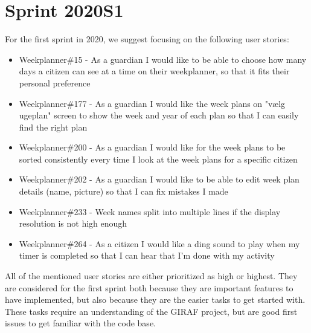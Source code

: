 \section{Sprint 2020S1}
For the first sprint in 2020, we suggest focusing on the following user stories:

\begin{itemize}
    \item Weekplanner\#15 - As a guardian I would like to be able to choose how many days a citizen can see at a time on their weekplanner, so that it fits their personal preference 
    \item Weekplanner\#177 - As a guardian I would like the week plans on "vælg ugeplan" screen to show the week and year of each plan so that I can easily find the right plan 
    \item Weekplanner\#200 - As a guardian I would like for the week plans to be sorted consistently every time I look at the week plans for a specific citizen
    \item Weekplanner\#202 - As a guardian I would like to be able to edit week plan details (name, picture) so that I can fix mistakes I made
    \item Weekplanner\#233 - Week names split into multiple lines if the display resolution is not high enough 
    \item Weekplanner\#264 - As a citizen I would like a ding sound to play when my timer is completed so that I can hear that I'm done with my activity
\end{itemize}
\noindent
All of the mentioned user stories are either prioritized as high or highest. 
They are considered for the first sprint both because they are important features to have implemented, but also because they are the easier tasks to get started with.
These tasks require an understanding of the GIRAF project, but are good first issues to get familiar with the code base.
